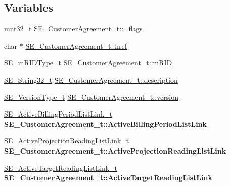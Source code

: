 \subsection*{Variables}
\begin{DoxyCompactItemize}
\item 
uint32\+\_\+t \hyperlink{group__CustomerAgreement_ga8ddcbc34833c692c07c506a9f7b2b8ee}{S\+E\+\_\+\+Customer\+Agreement\+\_\+t\+::\+\_\+flags}
\item 
char $\ast$ \hyperlink{group__CustomerAgreement_ga7c63e33bcba483bdc19aa2df820459c7}{S\+E\+\_\+\+Customer\+Agreement\+\_\+t\+::href}
\item 
\hyperlink{group__mRIDType_gac74622112f3a388a2851b2289963ba5e}{S\+E\+\_\+m\+R\+I\+D\+Type\+\_\+t} \hyperlink{group__CustomerAgreement_ga8299c1e475ea4383bd792736a412a571}{S\+E\+\_\+\+Customer\+Agreement\+\_\+t\+::m\+R\+ID}
\item 
\hyperlink{group__String32_gac9f59b06b168b4d2e0d45ed41699af42}{S\+E\+\_\+\+String32\+\_\+t} \hyperlink{group__CustomerAgreement_gaf44dd3b2c278f39a6a43178bc50eabbd}{S\+E\+\_\+\+Customer\+Agreement\+\_\+t\+::description}
\item 
\hyperlink{group__VersionType_ga4b8d27838226948397ed99f67d46e2ae}{S\+E\+\_\+\+Version\+Type\+\_\+t} \hyperlink{group__CustomerAgreement_ga27de1c2c7c2da3fce841f3aa2f87b9f2}{S\+E\+\_\+\+Customer\+Agreement\+\_\+t\+::version}
\item 
\mbox{\label{group__CustomerAgreement_ga61a05d6cb251dfa9eab9389b8f7b8a18}} 
\hyperlink{structSE__ActiveBillingPeriodListLink__t}{S\+E\+\_\+\+Active\+Billing\+Period\+List\+Link\+\_\+t} {\bfseries S\+E\+\_\+\+Customer\+Agreement\+\_\+t\+::\+Active\+Billing\+Period\+List\+Link}
\item 
\mbox{\label{group__CustomerAgreement_ga83a07b97eb62c45d0b393e6991e96afc}} 
\hyperlink{structSE__ActiveProjectionReadingListLink__t}{S\+E\+\_\+\+Active\+Projection\+Reading\+List\+Link\+\_\+t} {\bfseries S\+E\+\_\+\+Customer\+Agreement\+\_\+t\+::\+Active\+Projection\+Reading\+List\+Link}
\item 
\mbox{\label{group__CustomerAgreement_ga0b9506c0cc486e0bf0ed7b01d8e0f7be}} 
\hyperlink{structSE__ActiveTargetReadingListLink__t}{S\+E\+\_\+\+Active\+Target\+Reading\+List\+Link\+\_\+t} {\bfseries S\+E\+\_\+\+Customer\+Agreement\+\_\+t\+::\+Active\+Target\+Reading\+List\+Link}

\end{DoxyCompactItemize}
